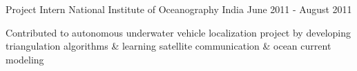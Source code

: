 \begin{cventries}
    \vspace{-0.1cm}

    \cventry
    {Project Intern} %
    {National Institute of Oceanography} %
    {India} %
    {June 2011 - August 2011} %
    {
      \begin{cvitems} %
      	\item {Contributed to autonomous underwater vehicle localization project by developing triangulation algorithms \& learning satellite communication \& ocean current modeling}
      \end{cvitems}
    }
    
    \vspace{-0.4cm}

\end{cventries}

